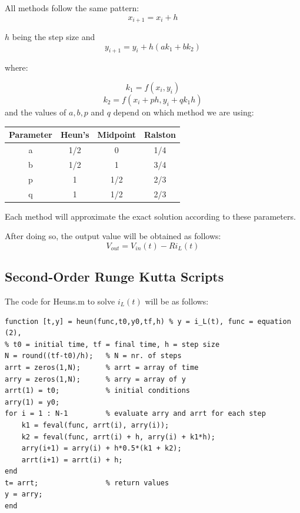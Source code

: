 \documentclass[11pt,a4paper]{article}
\begin{document}
All methods follow the same pattern:
\begin{equation}
x_{i+1} = x_i + h
\end{equation}

$h$ being the step size and
\begin{equation}
   y_{i+1} = y_i + h (a k_1 + b k_2)
\end{equation}

where:

\begin{equation}
k_1 = f(x_i, y_i)
\end{equation}
\begin{equation}
k_2 = f(x_i + p h, y_i + q k_1 h)
\end{equation}
and the values of $a, b, p$ and $q$ depend on which method we are using:

\begin{center}
 \begin{tabular}{||c | c c c||}
 \hline
 Parameter & Heun’s & Midpoint & Ralston \\ [0.5ex]
 \hline\hline
 a & 1/2 & 0 & 1/4 \\
 \hline
 b & 1/2 & 1 & 3/4 \\
 \hline
 p & 1 & 1/2 & 2/3 \\
 \hline
 q & 1 & 1/2 & 2/3 \\ [1ex]
 \hline
\end{tabular}
\end{center}

Each method will approximate the exact solution according to these parameters.

 After doing so, the output value will be obtained as follows:
\begin{equation}
V_{out} = V_{in}(t) - R i_L(t)
\end{equation}

\newpage

\subsection{Second-Order Runge Kutta Scripts}

\vspace{-2mm}The code for Heuns.m to solve $i_L(t)$ will be as follows:

\begin{verbatim}
function [t,y] = heun(func,t0,y0,tf,h) % y = i_L(t), func = equation (2),
% t0 = initial time, tf = final time, h = step size
N = round((tf-t0)/h);   % N = nr. of steps
arrt = zeros(1,N);      % arrt = array of time
arry = zeros(1,N);      % arry = array of y
arrt(1) = t0;           % initial conditions
arry(1) = y0;
for i = 1 : N-1         % evaluate arry and arrt for each step
    k1 = feval(func, arrt(i), arry(i));
    k2 = feval(func, arrt(i) + h, arry(i) + k1*h);
    arry(i+1) = arry(i) + h*0.5*(k1 + k2);
    arrt(i+1) = arrt(i) + h;
end
t= arrt;                % return values
y = arry;
end
\end{verbatim}
\end{document}
